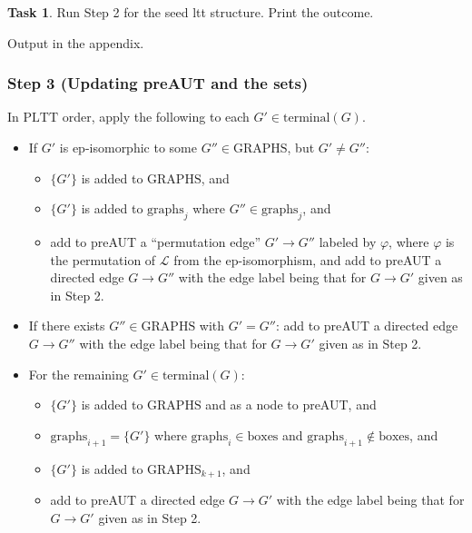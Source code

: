\documentclass[11pt]{article}
\theoremstyle{definition}
\newtheorem{task}[thm]{Task}
\begin{document}
\begin{task}\label{t:Step2}
Run Step 2 for the seed ltt structure. Print the outcome.
\end{task}

Output in the appendix.

\subsubsection{Step 3 (Updating preAUT and the sets)}

In $\mathrm{PLTT}$ order, apply the following to each
$G'\in\mathrm{terminal}(G)$.

\begin{itemize}
  \item If $G'$ is ep-isomorphic to some $G''\in\mathrm{GRAPHS}$, but
        $G'\neq G''$:
        \begin{itemize}
          \item $\{G'\}$ is added to $\mathrm{GRAPHS}$, and
          \item $\{G'\}$ is added to $\mathrm{graphs}_j$ where
                $G''\in\mathrm{graphs}_j$, and
          \item add to preAUT a ``permutation edge'' $G'\to G''$ labeled by $\varphi$, where
                $\varphi$ is the permutation of $\mathcal{L}$ from the ep-isomorphism, and
        add to preAUT a directed edge $G\to G''$ with the edge label being that for $G\to G'$ given as in Step 2.
        \end{itemize}

  \item If there exists $G''\in\mathrm{GRAPHS}$ with $G'=G''$:
        add to preAUT a directed edge $G\to G''$ with the edge label being that for $G\to G'$ given as in Step 2.

  \item For the remaining $G'\in\mathrm{terminal}(G)$:
        \begin{itemize}
          \item $\{G'\}$ is added to $\mathrm{GRAPHS}$ and as a node to preAUT, and
          \item $\mathrm{graphs}_{i+1}=\{G'\}$ where $\mathrm{graphs}_i\in\mathrm{boxes}$
                and $\mathrm{graphs}_{i+1}\notin\mathrm{boxes}$, and
          \item $\{G'\}$ is added to $\mathrm{GRAPHS}_{k+1}$, and
          \item add to preAUT a directed edge $G\to G'$ with the edge label being that for $G\to G'$ given as in Step 2.
        \end{itemize}
\end{itemize}
\end{document}
